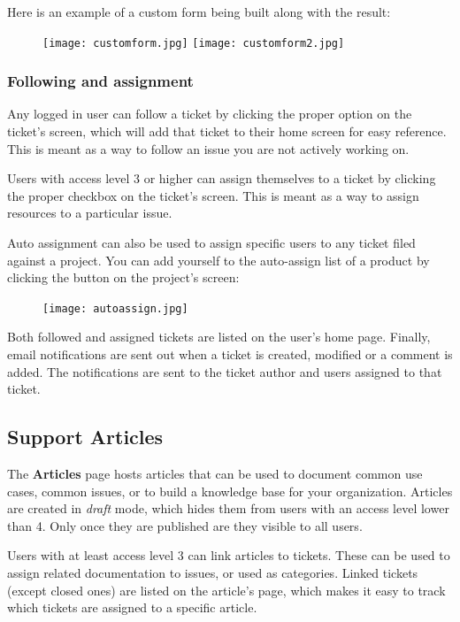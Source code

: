\documentclass[11pt]{article}
\begin{document}
Here is an example of a custom form being built along with the result:

\begin{figure}[h]
\texttt{[image: customform.jpg]}
\texttt{[image: customform2.jpg]}
\end{figure}

\subsubsection{Following and assignment}
Any logged in user can follow a ticket by clicking the proper option on the ticket's screen, which will add that ticket to their home screen for easy reference. This is meant as a way to follow an issue you are not actively working on.

Users with access level 3 or higher can assign themselves to a ticket by clicking the proper checkbox on the ticket's screen. This is meant as a way to assign resources to a particular issue.

Auto assignment can also be used to assign specific users to any ticket filed against a project. You can add yourself to the auto-assign list of a product by clicking the button on the project's screen:

\begin{figure}[h]
\texttt{[image: autoassign.jpg]}
\end{figure}

Both followed and assigned tickets are listed on the user's home page. Finally, email notifications are sent out when a ticket is created, modified or a comment is added. The notifications are sent to the ticket author and users assigned to that ticket.

\subsection{Support Articles}
The \textbf{Articles} page hosts articles that can be used to document common use cases, common issues, or to build a knowledge base for your organization. Articles are created in \textit{draft} mode, which hides them from users with an access level lower than 4. Only once they are published are they visible to all users.

Users with at least access level 3 can link articles to tickets. These can be used to assign related documentation to issues, or used as categories. Linked tickets (except closed ones) are listed on the article's page, which makes it easy to track which tickets are assigned to a specific article.
\end{document}
